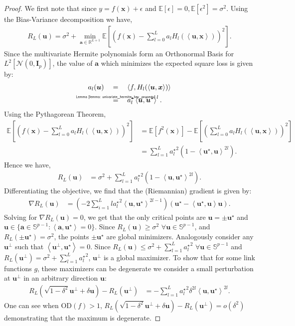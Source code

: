 \documentclass[final,12pt]{colt2018} %
\newcommand{\E}{\mathbb{E}}
\newcommand{\R}{\mathbb{R}}
\newcommand{\sd}[1]{\text{OD}(#1)}
\newcommand{\unitsphere}[1]{\mathbb{S}^{#1}}
\newcommand{\explain}[2]{\mathrel{\overset{\makebox[0pt]{\mbox{\normalfont\tiny\sffamily #1}}}{#2}}}
\newcommand{\gauss}[2]{\mathcal{N}\left( #1,#2 \right)}
\renewcommand\v[1]{{\ensuremath{\boldsymbol{#1}}}}
\newcommand\ip[1]{\left\langle #1 \right\rangle}
\begin{document}
\begin{proof}
We first note that since $y = f(\v x) + \epsilon$ and $\E[\epsilon] = 0, \E[\epsilon^2] = \sigma^2$. Using the Bias-Variance decomposition we have,
\begin{align*}
    R_L(\v u) = \sigma^2 + \min_{\v a \in \R^{L+1}} \E \left[ \left(f(\v x) - \sum_{l=0}^L a_l H_l(\ip{\v u,\v x}) \right)^2 \right].
\end{align*}
Since the multivariate Hermite polynomials form an Orthonormal Basis for $L^2[\gauss{0}{\v I_p}]$, the value of $\v a$ which minimizes the expected square loss is given by:
\begin{align*}
    a_l(\v u) &\quad=\quad \ip{f,H_l(\ip{\v u, \v x})} \\
        & \quad \explain{Lemma~\ref{lemma: univariate_hermite_key_property}}{=} \quad a_l^\star \ip{\v u, \v u^\star}^l. 
\end{align*}
Using the Pythagorean Theorem, 
\begin{align*}
    \E \left[ \left(f(\v x) - \sum_{l=0}^L a_l H_l(\ip{\v u,\v x}) \right)^2 \right] & = \E[f^2(\v x)] - \E\left[ \left( \sum_{l=0}^L a_l H_l(\ip{\v u,\v x}) \right)^2 \right] \\
    & = \sum_{l=1}^L {a_l^\star}^2(1- \ip{\v u^\star, \v u}^{2l}).
\end{align*}
Hence we have,
\begin{align*}
    R_L(\v u) & = \sigma^2  + \sum_{l=1}^L {a_l^\star}^2 (1-\ip{\v u, \v u^\star}^{2l}).
\end{align*}
Differentiating the objective, we find that the (Riemannian) gradient is given by:
\begin{align*}
    \nabla R_L(\v u) & = \left(-2\sum_{i=1}^L l {a_l^\star}^2 \ip{\v u, \v u^\star}^{2l-1} \right) \left( \v u^\star - \ip{\v u^\star, \v u} \v u \right). 
\end{align*}
Solving for $\nabla R_L(\v u) = 0$, we get that the only critical points are $\v u = \pm \v u^\star$ and  $\v u \in \{ \v a \in \unitsphere{p-1}: \ip{\v a, \v u^\star} = 0\}$. Since $R_L(\v u) \geq \sigma^2$ $\forall \v u \in \unitsphere{p-1}$, and $R_L(\pm \v u^\star) = \sigma^2$, the points $\pm \v u^\star$ are global minimizers. Analogously consider any $\v u^\perp$ such that $\ip{\v u^\perp, \v u^\star} = 0$. Since $R_L(\v u) \leq \sigma^2 + \sum_{l=1}^L {a_l^\star}^2$ $\forall \v u \in \unitsphere{p-1}$ and $R_L(\v u^\perp) = \sigma^2 + \sum_{l=1}^L {a_l^\star}^2$, $\v u^\perp$ is a global maximizer. To show that for some link functions $g$, these maximizers can be degenerate we consider a small perturbation at $\v u^\perp$ in an arbitrary direction $\v u$:
\begin{align*}
    R_L \left( \sqrt{1-\delta^2} \v u^\perp + \delta \v u\right) - R_L(\v u^\perp) & =  -\sum_{l=1}^L {a_l^\star}^2 \delta^{2l} \ip{\v u, \v u^\star}^{2l}.
\end{align*}
One can see when $\sd{f}>1$, $R_L \left( \sqrt{1-\delta^2} \v u^\perp + \delta \v u\right) - R_L(\v u^\perp) = o(\delta^2)$ demonstrating that the maximum is degenerate. 
\end{proof} 
\end{document}
